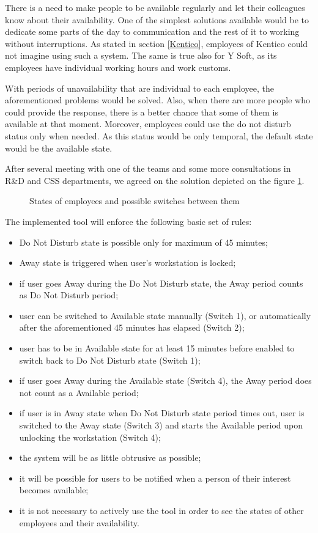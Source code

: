 \documentclass[11pt,singleside]{myfithesis2}
\newcommand{\pict}[4]{
	\begin{figure}[h!]
  		\vspace{-7px}
  		\centerline{\fcolorbox{darkgray}{palegray}{\texttt{[image: \#2]}}}
  		\caption{#1}
  		\label{#4}
	\end{figure}
}
\begin{document}
There is a need to make people to be available regularly and let their colleagues know about their availability. One of the simplest solutions available would be to dedicate some parts of the day to communication and the rest of it to working without interruptions. As stated in section \ref{Kentico}, employees of Kentico could not imagine using such a system. The same is true also for Y Soft, as its employees have individual working hours and work customs. 

With periods of unavailability that are individual to each employee, the aforementioned problems would be solved. Also, when there are more people who could provide the response, there is a better chance that some of them is available at that moment. Moreover, employees could use the do not disturb status only when needed. As this status would be only temporal, the default state would be the available state.

After several meeting with one of the teams and some more consultations in R\&D and CSS departments, we agreed on the solution depicted on the figure \ref{pic:states}.

\pict{States of employees and possible switches between them}{data/States.png}{width=0.8\textwidth}{pic:states}

The implemented tool will enforce the following basic set of rules:
\begin{itemize}
	\item Do Not Disturb state is possible only for maximum of 45 minutes;
	\item Away state is triggered when user's workstation is locked;
	\item if user goes Away during the Do Not Disturb state, the Away period counts as Do Not Disturb period;
	\item user can be switched to Available state manually (Switch 1), or automatically after the aforementioned 45 minutes has elapsed (Switch 2);
	\item user has to be in Available state for at least 15 minutes before enabled to switch back to Do Not Disturb state (Switch 1);
	\item if user goes Away during the Available state (Switch 4), the Away period does not count as a Available period;
	\item if user is in Away state when Do Not Disturb state period times out, user is switched to the Away state (Switch 3) and starts the Available period upon unlocking the workstation (Switch 4);
	\item the system will be as little obtrusive as possible;
	\item it will be possible for users to be notified when a person of their interest becomes available;
	\item it is not necessary to actively use the tool in order to see the states of other employees and their availability.
\end{itemize}
\end{document}
